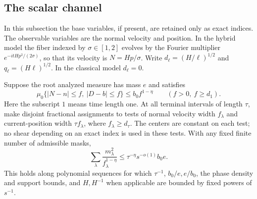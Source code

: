 \subsection{The scalar channel}

In this subsection the base variables, if present, are retained only as
exact indices. The observable variables are the normal velocity and
position. In the hybrid model the fiber indexed by $\sigma\in[1,2]$
evolves by the Fourier multiplier $e^{-itHp^2/(2\sigma)}$, so that its
velocity is $N=Hp/\sigma$. Write $d_\ell=(H/\ell)^{1/2}$ and
$q_\ell=(H\ell)^{1/2}$. In the classical model $d_\ell=0$.

\begin{proposition}\label{low:scalar}
Suppose the root analyzed measure has mass $e$ and satisfies
\[
 \mu_0\{|N-n|\leq f,\ |D-b|\leq f\}\leq b_0 f^{1-\eta}
 \qquad(f>0,\ f\geq d_1).
\]
Here the subscript $1$ means time length one. At all terminal intervals
of length $\tau$, make disjoint fractional assignments to tests of normal
velocity width $f_\lambda$ and current-position width $\tau f_\lambda$,
where $f_\lambda\geq d_\tau$. The centers are constant on each test;
no shear depending on an exact index is used in these tests. With any
fixed finite number of admissible masks,
\begin{equation}
 \sum_\lambda \frac{m_\lambda^2}{f_\lambda^{1-\eta}}
 \leq \tau^{-\eta}s^{-o(1)}b_0e.
 \tag{SC}\label{eq:SC}
\end{equation}
This holds along polynomial sequences for which $\tau^{-1}$,
$b_0/e,e/b_0$, the phase density and support bounds, and $H,H^{-1}$
when applicable are bounded by fixed powers of $s^{-1}$.
\end{proposition}

